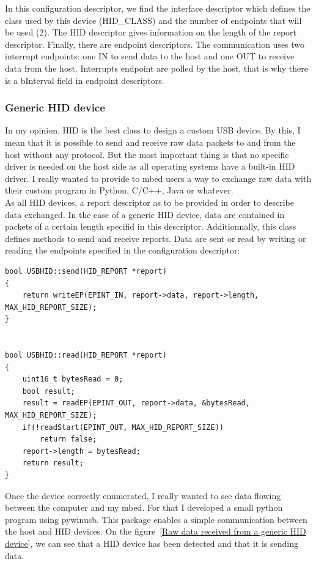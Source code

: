 \documentclass[pdftex,10pt,a4paper]{report}
\begin{document}
In this configuration descriptor, we find the interface descriptor which defines the class used by this device (HID\_CLASS) and the number of endpoints that will be used (2). The HID descriptor gives information on the length of the report descriptor. Finally, there are endpoint descriptors. The communication uses two interrupt endpoints: one IN to send data to the host and one OUT to receive data from the host. Interrupts endpoint are polled by the host, that is why there is a bInterval field in endpoint descriptors.
\\


\subsubsection{Generic HID device}
In my opinion, HID is the best class to design a custom USB device. By this, I mean that it is possible to send and receive raw data packets to and from the host without any protocol. But the most important thing is that no specific driver is needed on the host side as all operating systems have a built-in HID driver. I really wanted to provide to mbed users a way to exchange raw data with their custom program in Python, C/C++, Java or whatever. \\

As all HID devices, a report descriptor as to be provided in order to describe data exchanged. In the case of a generic HID device, data are contained in packets of a certain length specifid in this descriptor. Additionnally, this class defines methods to send and receive reports. Data are sent or read by writing or reading the endpoints specified in the configuration descriptor:

\begin{lstlisting}[label=Send and receive HID reports,caption=Send and receive HID reports]
bool USBHID::send(HID_REPORT *report)
{
    return writeEP(EPINT_IN, report->data, report->length, MAX_HID_REPORT_SIZE);
}


bool USBHID::read(HID_REPORT *report)
{
    uint16_t bytesRead = 0;
    bool result;
    result = readEP(EPINT_OUT, report->data, &bytesRead, MAX_HID_REPORT_SIZE);
    if(!readStart(EPINT_OUT, MAX_HID_REPORT_SIZE))
        return false;
    report->length = bytesRead;
    return result;
}
\end{lstlisting}

Once the device correctly enumerated, I really wanted to see data flowing between the computer and my mbed. For that I developed a small python program using pywinusb. This package enables a simple communication between the host and HID devices. On the figure~\ref{Raw data received from a generic HID device}, we can see that a HID device has been detected and that it is sending data.
\end{document}
